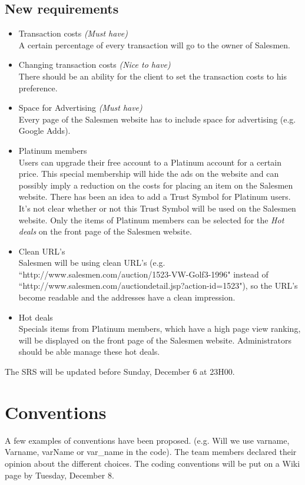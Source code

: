 \documentclass[a4paper, 12pt]{article}
\begin{document}
		\subsection{New requirements}
			\begin{itemize}
				\item Transaction costs \textit{(Must have)} \\
A certain percentage of every transaction will go to the owner of Salesmen.
				\item Changing transaction costs \textit{(Nice to have)}\\
There should be an ability for the client to set the transaction costs to his preference.
				\item Space for Advertising \textit{(Must have)}\\
Every page of the Salesmen website has to include space for advertising (e.g. Google Adds).
				\item Platinum members \\
Users can upgrade their free account to a Platinum account for a certain price. This special membership will hide the ads on the website and can possibly imply a reduction on the costs for placing an item on the Salesmen website. There has been an idea to add a Trust Symbol for Platinum users. It's not clear whether or not this Trust Symbol will be used on the Salesmen website. Only the items of Platinum members can be selected for the \textit{Hot deals} on the front page of the Salesmen website.
				\item Clean URL's \\
Salesmen will be using clean URL's (e.g. ``http://www.salesmen.com/auction/1523-VW-Golf3-1996" instead of ``http://www.salesmen.com/auctiondetail.jsp?action-id=1523"), so the URL's become readable and the addresses have a clean impression.
				\item Hot deals \\
Specials items from Platinum members, which have a high page view ranking, will be displayed on the front page of the Salesmen website. Administrators should be able manage these hot deals. 
			\end{itemize}
The SRS will be updated before Sunday, December 6 at 23H00.

	\section{Conventions}
A few examples of conventions have been proposed. (e.g. Will we use varname, Varname, varName or var\_{}name in the code). The team members declared their opinion about the different choices. The coding conventions will be put on a Wiki page by Tuesday, December 8.  
\end{document}
